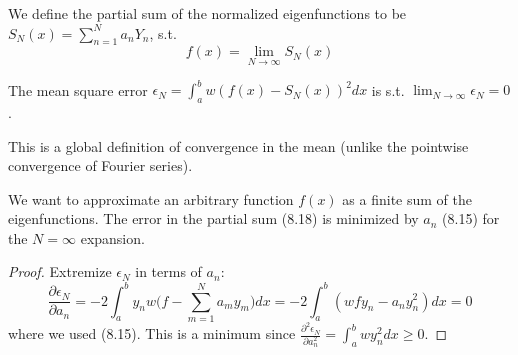 \documentclass[a4paper]{article}
\begin{document}
\begin{defi}
We define the partial sum of the normalized eigenfunctions to be $S_N(x)=\sum_{n=1}^Na_nY_n$, s.t.
\begin{equation}
    f(x)=\lim_{N\rightarrow\infty}S_N(x)\tag{8.18}
\end{equation}
\end{defi}
\begin{defi}
The mean square error
$\epsilon_N=\int_a^bw(f(x)-S_N(x))^2dx$ is s.t. $\lim_{N\rightarrow\infty}\epsilon_N=0$.
\end{defi}
This is a global definition of convergence in the mean (unlike the pointwise convergence of Fourier series).
\begin{prop}
We want to approximate an arbitrary function $f(x)$ as a finite sum of the eigenfunctions. The error in the partial sum (8.18) is minimized by $a_n$ (8.15) for the $N=\infty$ expansion.
\end{prop}
\begin{proof}
Extremize $\epsilon_N$ in terms of $a_n$:
$$\frac{\partial\epsilon_N}{\partial a_n}=-2\int_a^by_nw\bigg(f-\sum_{m=1}^Na_my_m\bigg)dx=-2\int_a^b(wfy_n-a_ny_n^2)dx=0$$
where we used (8.15). This is a minimum since
$\frac{\partial^2\epsilon_N}{\partial a_n^2}=\int_a^bwy_n^2dx\geq0$. 
\end{proof}
\end{document}
